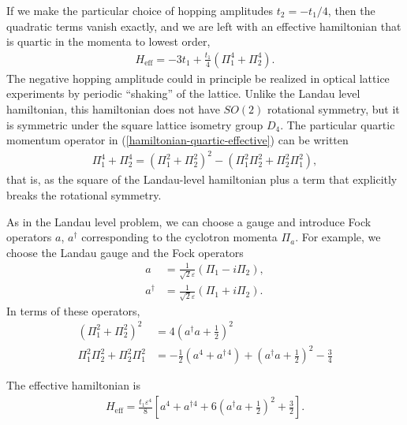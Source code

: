 \documentclass[aps,prb,twocolumn,letterpaper,twoside,nobalancelastpage,groupedaddress,amsmath,amssymb,floatfix,citeautoscript]{revtex4-1}
\begin{document}
If we make the particular choice of hopping amplitudes $t_2 = -t_1/4$, then the quadratic terms vanish exactly, and we are left with an effective hamiltonian that is quartic in the momenta to lowest order,
\begin{align}
\label{hamiltonian-quartic-effective}
H_{\text{eff}} = -3t_1 + \frac{t_1}{4} \left(\Pi_1^4 + \Pi_2^4\right).
\end{align}
The negative hopping amplitude could in principle be realized in optical lattice experiments by periodic ``shaking'' of the lattice. Unlike the Landau level hamiltonian, this hamiltonian does not have $SO(2)$ rotational symmetry, but it is symmetric under the square lattice isometry group $D_4$. The particular quartic momentum operator in (\ref{hamiltonian-quartic-effective}) can be written
\begin{align*}
\Pi_1^4 + \Pi_2^4 = \left(\Pi_1^2 + \Pi_2^2\right)^2 - \left(\Pi_1^2\Pi_2^2 + \Pi_2^2\Pi_1^2\right),
\end{align*}
that is, as the square of the Landau-level hamiltonian plus a term that explicitly breaks the rotational symmetry.

As in the Landau level problem, we can choose a gauge and introduce Fock operators $a$, $a^{\dag}$ corresponding to the cyclotron momenta $\Pi_a$. For example, we choose the Landau gauge and the Fock operators
\begin{align*}
a &= \frac{1}{\sqrt{2}\varepsilon}\left(\Pi_1 - i\Pi_2\right),\\
a^{\dag} &= \frac{1}{\sqrt{2}\varepsilon}\left(\Pi_1 + i\Pi_2\right).
\end{align*}
In terms of these operators,
\begin{align*}
\left(\Pi_1^2 + \Pi_2^2\right)^2 &= 4\left(a^{\dag}a + \frac{1}{2}\right)^2 \\
\Pi_1^2\Pi_2^2 + \Pi_2^2\Pi_1^2 &= -\frac{1}{2}\left(a^4 + a^{\dag\,4}\right) + \left(a^{\dag}a + \frac{1}{2}\right)^2 - \frac{3}{4}
\end{align*}

The effective hamiltonian is
\begin{align}
\label{effective-fock-hamiltonian}
H_{\text{eff}} = \frac{t_1\varepsilon^4}{8}\left[a^4 + a^{\dag 4} + 6\left(a^{\dag}a + \frac{1}{2}\right)^2 + \frac{3}{2}\right].
\end{align}
\end{document}
